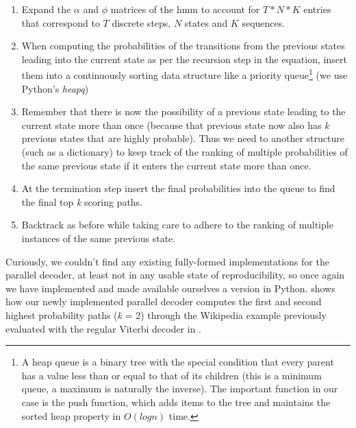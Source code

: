 {{{{{{{{\begin{enumerate}
  \item Expand the $\alpha$ and $\phi$ matrices of the \acrshort{hmm} to account for $T*N*K$ entries that correspond to $T$ discrete steps, $N$ states and $K$ sequences.
  \item When computing the probabilities of the transitions from the previous states leading into the current state as per the recursion step in the equation, insert them into a continuously sorting data structure like a priority queue\footnote{ A heap queue is a binary tree with the special condition that every parent has a value less than or equal to that of its children (this is a minimum queue, a maximum is naturally the inverse). The important function in our case is the push function, which adds items to the tree and maintains the sorted heap property in $O(log n)$ time. } (we use Python's \textit{heapq})
  \item Remember that there is now the possibility of a previous state leading to the current state more than once (because that previous state now also has $k$ previous states that are highly probable). Thus we need to another structure (such as a dictionary) to keep track of the ranking of multiple probabilities of the same previous state if it enters the current state more than once.
  \item At the termination step insert the final probabilities into the queue to find the final top \textit{k} scoring paths.
  \item Backtrack as before while taking care to adhere to the ranking of multiple instances of the same previous state.
\end{enumerate}

Curiously, we couldn't find any existing fully-formed implementations for the parallel decoder, at least not in any usable state of reproducibility, so once again we have implemented and made available ourselves a version in Python.  shows how our newly implemented parallel decoder computes the first and second highest probability paths (\textit{k} = 2) through the Wikipedia example previously evaluated with the regular Viterbi decoder in .

}}}}}}}}
